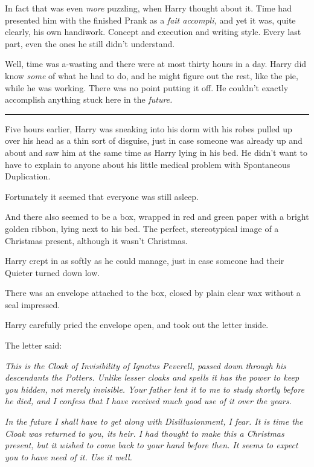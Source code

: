 In fact that was even \emph{more} puzzling, when Harry thought about it. Time had presented him with the finished Prank as a \emph{fait accompli,} and yet it was, quite clearly, his own handiwork. Concept and execution and writing style. Every last part, even the ones he still didn't understand.

Well, time was a-wasting and there were at most thirty hours in a day. Harry did know \emph{some} of what he had to do, and he might figure out the rest, like the pie, while he was working. There was no point putting it off. He couldn't exactly accomplish anything stuck here in the \emph{future.}

\begin{center}\rule{3in}{0.4pt}\end{center}

Five hours earlier, Harry was sneaking into his dorm with his robes pulled up over his head as a thin sort of disguise, just in case someone was already up and about and saw him at the same time as Harry lying in his bed. He didn't want to have to explain to anyone about his little medical problem with Spontaneous Duplication.

Fortunately it seemed that everyone was still asleep.

And there also seemed to be a box, wrapped in red and green paper with a bright golden ribbon, lying next to his bed. The perfect, stereotypical image of a Christmas present, although it wasn't Christmas.

Harry crept in as softly as he could manage, just in case someone had their Quieter turned down low.

There was an envelope attached to the box, closed by plain clear wax without a seal impressed.

Harry carefully pried the envelope open, and took out the letter inside.

The letter said:

\emph{This is the Cloak of Invisibility of Ignotus Peverell, passed down through his descendants the Potters. Unlike lesser cloaks and spells it has the power to keep you hidden, not merely invisible. Your father lent it to me to study shortly before he died, and I confess that I have received much good use of it over the years.}

\emph{In the future I shall have to get along with Disillusionment, I fear. It is time the Cloak was returned to you, its heir. I had thought to make this a Christmas present, but it wished to come back to your hand before then. It seems to expect you to have need of it. Use it well.}

